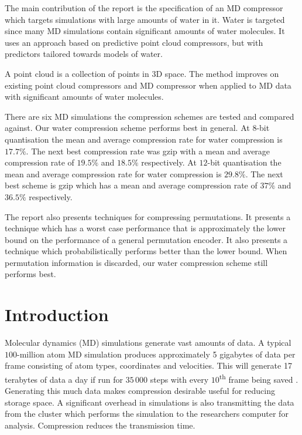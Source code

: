\documentclass[a4paper]{report}
\begin{document}
The main contribution of the report is the specification of an MD compressor
which targets simulations with large amounts of water in it. Water is targeted
since many MD simulations contain significant amounts of water molecules. It
uses an approach based on predictive point cloud compressors, but with
predictors tailored towards models of water.

A point cloud is a collection of points in 3D space. The method improves on
existing point cloud compressors \citep{gumholdcomp,devillers2000gci} and MD
compressor \citep{omeltchenko2000sls} when applied to MD data with significant
amounts of water molecules.

There are six MD simulations the compression schemes are tested and compared
against. Our water compression scheme performs best in general.  At $8$-bit
quantisation the mean and average compression rate for water compression is
$17.7\%$. The next best compression rate was gzip with a mean and average
compression rate of $19.5\%$ and $18.5\%$ respectively. At $12$-bit
quantisation the mean and average compression rate for water compression is
$29.8\%$. The next best scheme is gzip which has a mean and average
compression rate of $37\%$ and $36.5\%$ respectively.

The report also presents techniques for compressing permutations. It presents
a technique which has a worst case performance that is approximately the lower
bound on the performance of a general permutation encoder. It also presents a
technique which probabilistically performs better than the lower bound. When
permutation information is discarded, our water compression scheme still
performs best.

\tableofcontents

\chapter{Introduction}

Molecular dynamics (MD) simulations generate vast amounts of data. A typical
$100$-million atom MD simulation produces approximately 5 gigabytes of data
per frame consisting of atom types, coordinates and velocities. This will
generate 17 terabytes of data a day if run for $35\,000$ steps with every
$10$\textsuperscript{th} frame being saved
\citep{omeltchenko2000sls}. Generating this much data makes compression
desirable useful for reducing storage space. A significant overhead in
simulations is also transmitting the data from the cluster which performs the
simulation to the researchers computer for analysis. Compression reduces the
transmission time.
\end{document}
